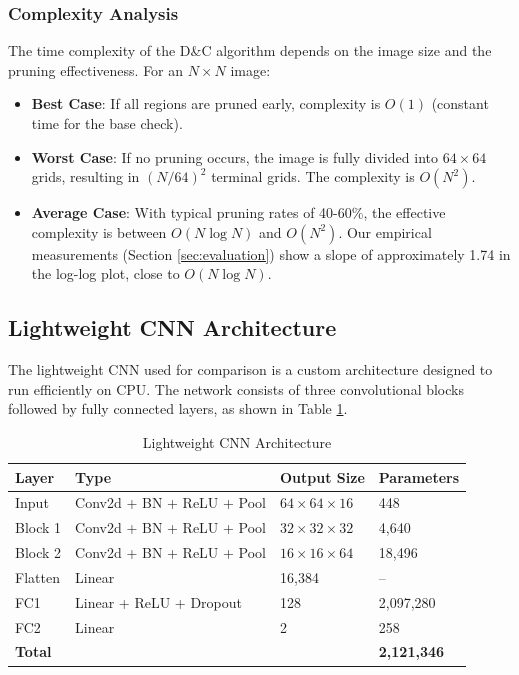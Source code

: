 \documentclass[conference]{IEEEtran}
\begin{document}
\subsubsection{Complexity Analysis}

The time complexity of the D\&C algorithm depends on the image size and the pruning effectiveness. For an $N \times N$ image:

\begin{itemize}
    \item \textbf{Best Case}: If all regions are pruned early, complexity is $O(1)$ (constant time for the base check).
    \item \textbf{Worst Case}: If no pruning occurs, the image is fully divided into $64 \times 64$ grids, resulting in $(N/64)^2$ terminal grids. The complexity is $O(N^2)$.
    \item \textbf{Average Case}: With typical pruning rates of 40-60\%, the effective complexity is between $O(N \log N)$ and $O(N^2)$. Our empirical measurements (Section \ref{sec:evaluation}) show a slope of approximately 1.74 in the log-log plot, close to $O(N \log N)$.
\end{itemize}

\subsection{Lightweight CNN Architecture}

The lightweight CNN used for comparison is a custom architecture designed to run efficiently on CPU. The network consists of three convolutional blocks followed by fully connected layers, as shown in Table \ref{tab:cnn-arch}.

\begin{table}[htbp]
\centering
\caption{Lightweight CNN Architecture}
\label{tab:cnn-arch}
\begin{tabular}{@{}llll@{}}
\toprule
\textbf{Layer} & \textbf{Type} & \textbf{Output Size} & \textbf{Parameters} \\
\midrule
Input & Conv2d + BN + ReLU + Pool & $64 \times 64 \times 16$ & 448 \\
Block 1 & Conv2d + BN + ReLU + Pool & $32 \times 32 \times 32$ & 4,640 \\
Block 2 & Conv2d + BN + ReLU + Pool & $16 \times 16 \times 64$ & 18,496 \\
Flatten & Linear & 16,384 & -- \\
FC1 & Linear + ReLU + Dropout & 128 & 2,097,280 \\
FC2 & Linear & 2 & 258 \\
\midrule
\textbf{Total} & & & \textbf{2,121,346} \\
\bottomrule
\end{tabular}
\end{table}
\end{document}
